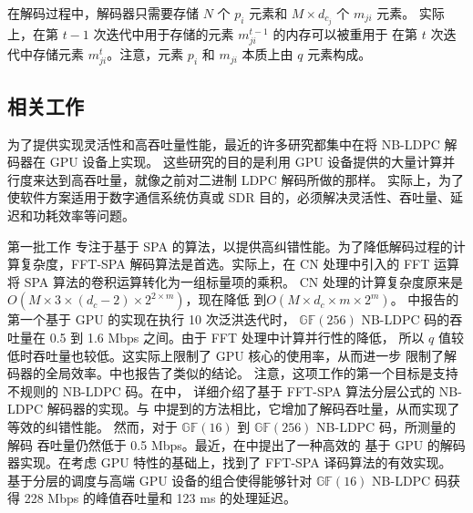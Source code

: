 \documentclass{cjc}
\begin{document}
  在解码过程中，解码器只需要存储 $N$ 个 $p_i$ 元素和 $M\times{d_{c_j}}$ 个 $m_{ji}$ 元素。
  实际上，在第 $t−1$ 次迭代中用于存储的元素 $m^{t-1}_{ji}$ 的内存可以被重用于
  在第 $t$ 次迭代中存储元素 $m^t_{ji}$。注意，元素 $p_i$ 和 $m_{ji}$ 本质上由 $q$ 元素构成。

\subsection{相关工作}
  
  为了提供实现灵活性和高吞吐量性能，最近的许多研究都集中在将 NB-LDPC 解码器在 GPU 设备上实现\cite{noauthor_wang_nodate,noauthor_andrade_nodate,noauthor_beermann_nodate,andrade_optimized_2014,noauthor_thi_nodate,beermann_gpu_2015,noauthor_pham_nodate,liu_high-throughput_2018}。
  这些研究的目的是利用 GPU 设备提供的大量计算并行度来达到高吞吐量，就像之前对二进制
  LDPC 解码所做的那样\cite{li_efficient_2013,lin_high_2014,gal_high-throughput_2016}。
  实际上，为了使软件方案适用于数字通信系统仿真或 SDR 目的，必须解决灵活性、吞吐量、延迟和功耗效率等问题。

  第一批工作\cite{noauthor_andrade_nodate,noauthor_beermann_nodate,andrade_optimized_2014,beermann_gpu_2015,liu_high-throughput_2018}
  专注于基于 SPA 的算法，以提供高纠错性能。为了降低解码过程的计算复杂度，FFT-SPA \cite{noauthor_andrade_nodate}
  解码算法是首选。实际上，在 CN 处理中引入的 FFT 运算将 SPA 算法的卷积运算转化为一组标量项的乘积。
  CN 处理的计算复杂度原来是$O(M\times3\times(d_c−2)\times2^{2{\times}m})$，现在降低
  到$O(M\times{d_c}\times{m}\times2^{m})$\cite{declercq_decoding_2007}。
  \cite{noauthor_andrade_nodate}中报告的第一个基于 GPU 的实现在执行 10 次泛洪迭代时，
  $\mathbb{GF}(256)$ NB-LDPC 码的吞吐量在 0.5 到 1.6 Mbps 之间。由于 FFT 处理中计算并行性的降低，
  所以 $q$ 值较低时吞吐量也较低。这实际上限制了 GPU 核心的使用率，从而进一步
  限制了解码器的全局效率。\cite{noauthor_beermann_nodate}中也报告了类似的结论。
  注意，这项工作的第一个目标是支持不规则的 NB-LDPC 码。在\cite{beermann_gpu_2015}中，
  详细介绍了基于 FFT-SPA 算法分层公式的 NB-LDPC 解码器的实现。与\cite{noauthor_beermann_nodate}
  中提到的方法相比，它增加了解码吞吐量，从而实现了等效的纠错性能。
  然而，对于 $\mathbb{GF}(16)$ 到 $\mathbb{GF}(256)$ NB-LDPC 码，所测量的解码
  吞吐量仍然低于 0.5 Mbps。最近，在\cite{liu_high-throughput_2018}中提出了一种高效的
  基于 GPU 的解码器实现。在考虑 GPU 特性的基础上，找到了 FFT-SPA 译码算法的有效实现。
  基于分层的调度与高端 GPU 设备的组合使得能够针对 $\mathbb{GF}(16)$ NB-LDPC 码获得
  228 Mbps 的峰值吞吐量和 123 ms 的处理延迟。
\end{document}
